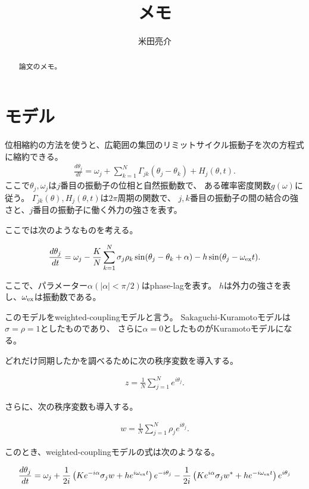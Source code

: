 \documentclass{jsarticle}
\begin{document}
\title{メモ}
\author{米田亮介}
\maketitle	

\begin{abstract}
論文\cite{terada2018role}のメモ。
\end{abstract}

\section{モデル}
位相縮約の方法を使うと、広範囲の集団のリミットサイクル振動子を次の方程式に縮約できる。
\begin{align}
\frac{d\theta_{j}}{dt}=\omega_{j}+\sum_{k=1}^{N}\Gamma_{jk}(\theta_{j}-\theta_{k})+H_{j}(\theta,t).
\end{align}
ここで$\theta_{j},\omega_{j}$は$j$番目の振動子の位相と自然振動数で、
ある確率密度関数$g(\omega)$に従う。
$\Gamma_{jk}(\theta),H_{j}(\theta,t)$は$2\pi$周期の関数で、
$j,k$番目の振動子の間の結合の強さと、$j$番目の振動子に働く外力の強さを表す。

ここでは次のようなものを考える。
\begin{framed}
\begin{align}
\frac{d\theta_{j}}{dt}=\omega_{j}-\frac{K}{N}\sum_{k=1}^{N}\sigma_{j}\rho_{k}\sin(\theta_{j}-\theta_{k}+\alpha)-h\sin(\theta_{j}-\omega_{\rm ex}t).
\end{align}
\end{framed}
ここで、パラメーター$\alpha(|\alpha|<\pi/2)$はphase-lagを表す。
$h$は外力の強さを表し、$\omega_{\rm ex}$は振動数である。

このモデルをweighted-couplingモデルと言う。
Sakaguchi-Kuramotoモデルは$\sigma=\rho=1$としたものであり、
さらに$\alpha=0$としたものがKuramotoモデルになる。

どれだけ同期したかを調べるために次の秩序変数を導入する。
\begin{framed}
\begin{align}
z=\frac{1}{N}\sum_{j=1}^{N}e^{i\theta_{j}}.
\end{align}
\end{framed}
さらに、次の秩序変数も導入する。
\begin{framed}
\begin{align}
w=\frac{1}{N}\sum_{j=1}^{N}\rho_{j}e^{i\theta_{j}}.
\end{align}
\end{framed}
このとき、weighted-couplingモデルの式は次のようなる。
\begin{framed}
\begin{align}
\frac{d\theta_{j}}{dt}=\omega_{j}+\frac{1}{2i}\left(Ke^{-i\alpha}\sigma_{j}w+he^{i\omega_{\rm ex}t}\right)e^{-i\theta_{j}}
-\frac{1}{2i}\left(Ke^{i\alpha}\sigma_{j}w^{*}+he^{-i\omega_{\rm ex}t}\right)e^{i\theta_{j}}
\end{align}
\end{framed}
\end{document}

